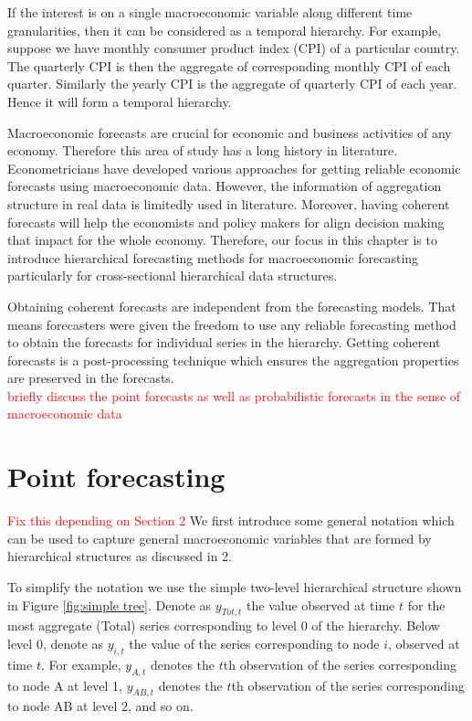 \documentclass[graybox]{svmult}
\begin{document}
If the interest is on a single macroeconomic variable along different time granularities, then it can be considered as a temporal hierarchy. For example, suppose we have monthly consumer product index (CPI) of a particular country. The quarterly CPI is then the aggregate of corresponding monthly CPI of each quarter. Similarly the yearly CPI is the aggregate of quarterly CPI of each year. Hence it will form a temporal hierarchy.

Macroeconomic forecasts are crucial for economic and business activities of any economy. Therefore this area of study has a long history in literature. Econometricians have developed various approaches for getting reliable economic forecasts using macroeconomic data. However, the information of aggregation structure in real data is limitedly used in literature. Moreover, having coherent forecasts will help the economists and policy makers for align decision making that impact for the whole economy. Therefore, our focus in this chapter is to introduce hierarchical forecasting methods for macroeconomic forecasting particularly for cross-sectional hierarchical data structures.

Obtaining coherent forecasts are independent from the forecasting models. That means forecasters were given the freedom to use any reliable forecasting method to obtain the forecasts for individual series in the hierarchy. Getting coherent forecasts is a post-processing technique which ensures the aggregation properties are preserved in the forecasts.   \\


\textcolor{red}{briefly discuss the point forecasts as well as probabilistic forecasts in the sense of macroeconomic data  }

\newpage
\section{Point forecasting}\label{sec:point forecasting}

\textcolor{red}{Fix this depending on Section 2} We first introduce some general notation which can be used to capture general macroeconomic variables that are formed by hierarchical structures as discussed in 2. 

To simplify the notation we use the simple two-level hierarchical structure shown in Figure \ref{fig:simple tree}. Denote as $y_{Tot,t}$ the value observed at time $t$ for the most aggregate (Total) series  corresponding to level 0 of the hierarchy. Below level 0, denote as $y_{i,t}$ the value of the series corresponding to node $i$, observed at time $t$. For example, $y_{A,t}$ denotes the $t$th observation of the series corresponding to node A at level 1, $y_{AB,t}$ denotes the $t$th observation of the series corresponding to node AB at level 2, and so on.
\end{document}
